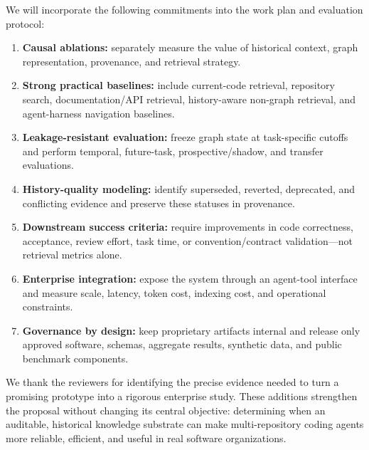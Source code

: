 \documentclass[11pt]{article}
\begin{document}
We will incorporate the following commitments into the work plan and evaluation protocol:

\begin{enumerate}
  \item \textbf{Causal ablations:} separately measure the value of historical context, graph representation, provenance, and retrieval strategy.
  \item \textbf{Strong practical baselines:} include current-code retrieval, repository search, documentation/API retrieval, history-aware non-graph retrieval, and agent-harness navigation baselines.
  \item \textbf{Leakage-resistant evaluation:} freeze graph state at task-specific cutoffs and perform temporal, future-task, prospective/shadow, and transfer evaluations.
  \item \textbf{History-quality modeling:} identify superseded, reverted, deprecated, and conflicting evidence and preserve these statuses in provenance.
  \item \textbf{Downstream success criteria:} require improvements in code correctness, acceptance, review effort, task time, or convention/contract validation---not retrieval metrics alone.
  \item \textbf{Enterprise integration:} expose the system through an agent-tool interface and measure scale, latency, token cost, indexing cost, and operational constraints.
  \item \textbf{Governance by design:} keep proprietary artifacts internal and release only approved software, schemas, aggregate results, synthetic data, and public benchmark components.
\end{enumerate}

We thank the reviewers for identifying the precise evidence needed to turn a promising prototype into a rigorous enterprise study. These additions strengthen the proposal without changing its central objective: determining when an auditable, historical knowledge substrate can make multi-repository coding agents more reliable, efficient, and useful in real software organizations.
\end{document}
